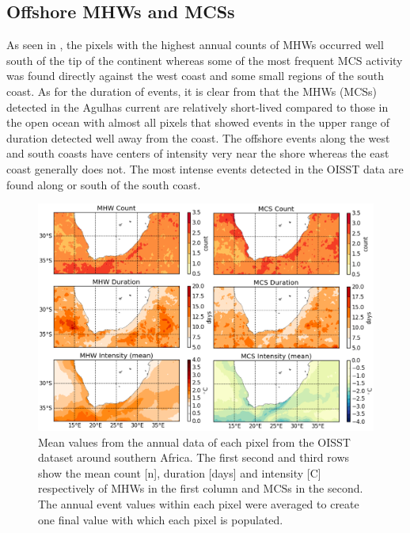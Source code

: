 \documentclass[a4paper,10pt,review]{elsarticle}
\begin{document}
\subsection{Offshore MHWs and MCSs}
As seen in , the pixels with the highest annual counts of MHWs occurred well south of the tip of the continent whereas some of the most frequent MCS activity was found directly against the west coast and some small regions of the south coast. As for the duration of events, it is clear from  that the MHWs (MCSs) detected in the Agulhas current are relatively short-lived compared to those in the open ocean with almost all pixels that showed events in the upper range of duration detected well away from the coast. The offshore events along the west and south coasts have centers of intensity very near the shore whereas the east coast generally does not. The most intense events detected in the OISST data are found along or south of the south coast.

\begin{figure}
\centering \includegraphics[width=1.0\textwidth]{MHW_MCS_mean.png}
\caption{Mean values from the annual data of each pixel from the OISST dataset around southern Africa. The first second and third rows show the mean count [n], duration [days] and intensity [\degree C] respectively of MHWs in the first column and MCSs in the second. The annual event values within each pixel were averaged to create one final value with which each pixel is populated.}
\label{fig:Figure6}
\end{figure}
\end{document}

